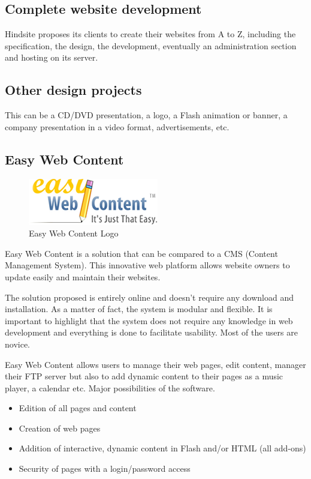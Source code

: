 \subsection{Complete website development}

Hindsite proposes its clients to create their websites from A to Z, including the
specification, the design, the development, eventually an administration
section and hosting on its server.

\subsection{Other design projects}

This can be a CD/DVD presentation, a logo, a Flash animation or banner, a
company presentation in a video format, advertisements, etc.

\subsection{Easy Web Content}
\begin{figure}[!ht]
\centering
\includegraphics[width=.30\textwidth]{img/ewc.png}
\caption{Easy Web Content Logo}
\label{figure:ewc-logo}
\end{figure}

Easy Web Content is a solution that can be compared to a CMS (Content
Management System). This innovative web platform allows website owners to
update easily and maintain their websites.

The solution proposed is entirely online and doesn’t require any download and
installation. As a matter of fact, the system is modular and flexible.
It is important to highlight that the system does not require any knowledge in web
development and everything is done to facilitate usability. Most of the users are
novice.

Easy Web Content allows users to manage their web pages, edit content, manager
their FTP server but also to add dynamic content to their pages as a music player, a calendar etc. Major possibilities of the software.

\begin{itemize}
\item Edition of all pages and content
\item Creation of web pages
\item Addition of interactive, dynamic content in Flash and/or HTML (all add-ons)
\item Security of pages with a login/password access
\end{itemize}

